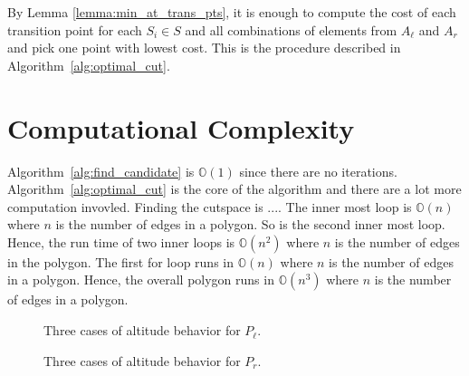 \documentclass[../main.tex]{subfiles}
\begin{document}
By Lemma \ref{lemma:min_at_trans_pts}, it is enough to compute the cost of each transition point for each $S_i\in S$ and all combinations of elements from $A_{\ell}$ and $A_r$ and pick one point with lowest cost. This is the procedure described in Algorithm~\ref{alg:optimal_cut}.

\section{Computational Complexity}
\label{section:single_agent_complexity}

Algorithm~\ref{alg:find_candidate} is $\mathbb{O}(1)$ since there are no iterations. Algorithm~\ref{alg:optimal_cut} is the core of the algorithm and there are a lot more computation invovled. Finding the cutspace is ....  The inner most loop is $\mathbb{O}(n)$ where $n$ is the number of edges in a polygon. So is the second inner most loop. Hence, the run time of two inner loops is $\mathbb{O}(n^2)$ where $n$ is the number of edges in the polygon. The first for loop runs in $\mathbb{O}(n)$ where $n$ is the number of edges in a polygon. Hence, the overall polygon runs in $\mathbb{O}(n^3)$ where $n$ is the number of edges in a polygon.

\begin{figure}
	\centering
	\begin{subfigure}{0.45\linewidth}
		\centering
		
		\caption{\label{fig:altitude_case_i}}
	\end{subfigure}%
	\quad
	\begin{subfigure}{0.45\linewidth}
		\centering
		
		\caption{\label{fig:altitude_case_ii}}
	\end{subfigure}
	\begin{subfigure}{0.45\linewidth}
		\centering
		
		\caption{\label{fig:altitude_case_iii}}
	\end{subfigure}
	\caption{Three cases of altitude behavior for $P_{\ell}$.}
	\label{fig:altitude_cases_pl}
\end{figure}

\begin{figure}
	\centering
	\begin{subfigure}{0.45\linewidth}
		\centering
		
		\caption{\label{fig:altitude_case_pr_i}}
	\end{subfigure}%
	\quad
	\begin{subfigure}{0.45\linewidth}
		\centering
		
		\caption{\label{fig:altitude_case_pr_ii}}
	\end{subfigure}
	\begin{subfigure}{0.45\linewidth}
		\centering
		
		\caption{\label{fig:altitude_case_pr_iii}}
	\end{subfigure}
	\caption{Three cases of altitude behavior for $P_r$.}
	\label{fig:altitude_cases_pr}
\end{figure}
\end{document}
